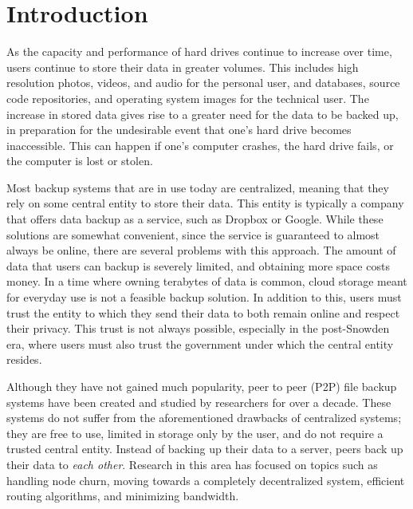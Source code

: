 \documentclass[12pt]{report}
\begin{document}
\tableofcontents
\listoffigures

\chapter{Introduction}

As the capacity and performance of hard drives continue to increase over time, users continue to store their data in greater volumes. This includes high resolution photos, videos, and audio for the personal user, and databases, source code repositories, and operating system images for the technical user. The increase in stored data gives rise to a greater need for the data to be backed up, in preparation for the undesirable event that one's hard drive becomes inaccessible. This can happen if one's computer crashes, the hard drive fails, or the computer is lost or stolen.

Most backup systems that are in use today are centralized, meaning that they rely on some central entity to store their data. This entity is typically a company that offers data backup as a service, such as Dropbox or Google. While these solutions are somewhat convenient, since the service is guaranteed to almost always be online, there are several problems with this approach. The amount of data that users can backup is severely limited, and obtaining more space costs money. In a time where owning terabytes of data is common, cloud storage meant for everyday use is not a feasible backup solution. In addition to this, users must trust the entity to which they send their data to both remain online and respect their privacy. This trust is not always possible, especially in the post-Snowden era, where users must also trust the government under which the central entity resides.

Although they have not gained much popularity, peer to peer (P2P) file backup systems have been created and studied by researchers for over a decade. These systems do not suffer from the aforementioned drawbacks of centralized systems; they are free to use, limited in storage only by the user, and do not require a trusted central entity. Instead of backing up their data to a server, peers back up their data to \textit{each other}. Research in this area has focused on topics such as handling node churn, moving towards a completely decentralized system, efficient routing algorithms, and minimizing bandwidth.
\end{document}
